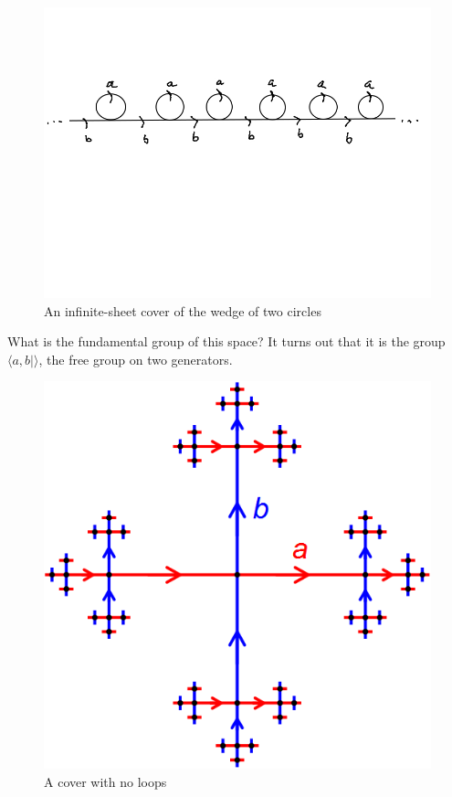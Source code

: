 \begin{figure}[!htb]
	\centering
	\includegraphics[scale=.5]{images/wedge2circcovinf}
	\caption{An infinite-sheet cover of the wedge of two circles}
	\label{fig:wedge2circcovinf}
\end{figure}

What is the fundamental group of this space? It turns out that it is the group $\langle a,b|\rangle$, the free group on two generators.

\begin{figure}[!htb]
	\centering
	\includegraphics[scale=.5]{images/F2_Cayley_Graph}
	\caption{A cover with no loops}
	\label{fig:f2cayley}
\end{figure}

